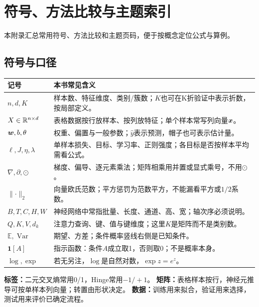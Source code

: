 \chapter{符号、方法比较与主题索引}
\label{ch:reference}

本附录汇总常用符号、方法比较和主题页码，便于按概念定位公式与算例。

\section{符号与口径}
\label{sec:reference-notation}
\begingroup
\setlength{\LTpre}{3pt}\setlength{\LTpost}{4pt}
\begin{xltabular}{\textwidth}{P{30mm}Y}
\toprule
记号 & 本书常见含义\\
\midrule
\endhead
\bottomrule
\endfoot
$n,d,K$ & 样本数、特征维度、类别/簇数；$K$也可在K折验证中表示折数，按局部定义。\\
$X\in\mathbb{R}^{n\times d}$ & 表格数据按行放样本、按列放特征；单个样本常写列向量$\boldsymbol{x}$。\\
$\boldsymbol{w},b,\theta$ & 权重、偏置与一般参数；$\hat y$表示预测，帽子也可表示估计量。\\
$\ell,J,\eta,\lambda$ & 单样本损失、目标、学习率、正则强度；各目标是否按样本平均需看公式。\\
$\nabla,\partial,\odot$ & 梯度、偏导、逐元素乘法；矩阵相乘用并置或显式乘号，不用$\odot$。\\
$\lVert\cdot\rVert_2$ & 向量欧氏范数；平方惩罚为范数平方，不能漏看平方或$1/2$系数。\\
$B,T,C,H,W$ & 神经网络中常指批量、长度、通道、高、宽；轴次序必须说明。\\
$Q,K,V,d_k$ & 注意力查询、键、值与键维度；这里$K$是矩阵而不是类别数。\\
$\mathbb E,\operatorname{Var}$ & 期望、方差；条件概率竖线右侧是已知条件。\\
$\mathbf1[A]$ & 指示函数：条件$A$成立取1，否则取0；不是概率本身。\\
$\log,\exp$ & 若无另注，$\log$是自然对数，$\exp z=e^z$。\\

\end{xltabular}
\endgroup

\begin{keyidea}[先确认三个口径]
\textbf{标签：}二元交叉熵常用0/1，Hinge常用$-1/+1$。
\textbf{矩阵：}表格样本按行，神经元推导可按单样本列向量；转置由形状决定。
\textbf{数据：}训练用来拟合，验证用来选择，测试用来评价已确定流程。
\end{keyidea}

